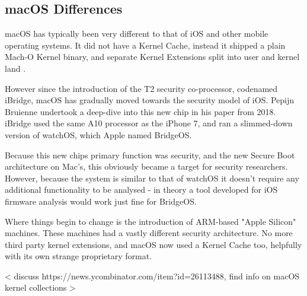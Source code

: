 \subsection{macOS Differences}

macOS has typically been very different to that of iOS and other mobile operating systems. It did not have a Kernel Cache, instead it shipped a plain Mach-O Kernel binary, and separate Kernel Extensions split into user and kernel land \cite{apple-system-kernel-macos}.

However since the introduction of the T2 security co-processor, codenamed iBridge, macOS has gradually moved towards the security model of iOS. Pepijn Bruienne undertook a deep-dive into this new chip in his paper from 2018\cite{duo-labs-t2-intro}. iBridge used the same A10 processor as the iPhone 7, and ran a slimmed-down version of watchOS, which Apple named BridgeOS.

Because this new chips primary function was security, and the new Secure Boot architecture on Mac's, this obviously became a target for security researchers. However, because the system is similar to that of watchOS it doesn't require any additional functionality to be analysed - in theory a tool developed for iOS firmware analysis would work just fine for BridgeOS.

Where things begin to change is the introduction of ARM-based "Apple Silicon" machines. These machines had a vastly different security architecture. No more third party kernel extensions, and macOS now used a Kernel Cache too, helpfully with its own strange proprietary format. 

< discuss https://news.ycombinator.com/item?id=26113488, find info on macOS kernel collections >